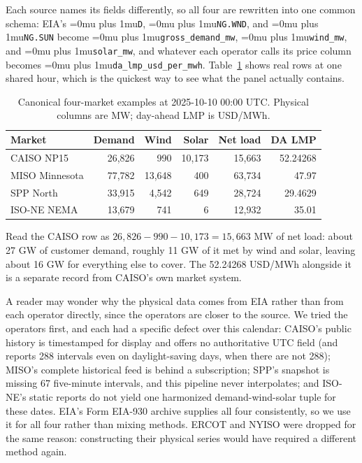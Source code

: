 ﻿\documentclass[12pt]{article}
\newcommand{\codepath}[1]{{\Urlmuskip=0mu plus 1mu\relax\nolinkurl{#1}}}
\begin{document}
Each source names its fields differently, so all four are rewritten into one
common schema: EIA's \codepath{D}, \codepath{NG.WND}, and \codepath{NG.SUN}
become \codepath{gross_demand_mw}, \codepath{wind_mw}, and \codepath{solar_mw},
and whatever each operator calls its price column becomes
\codepath{da_lmp_usd_per_mwh}. Table~\ref{tab:energy-example-rows} shows real
rows at one shared hour, which is the quickest way to see what the panel
actually contains.

\begin{table}[htbp]
  \centering
  \small
  \caption{Canonical four-market examples at 2025-10-10 00:00 UTC. Physical
  columns are MW; day-ahead LMP is USD/MWh.}
  \label{tab:energy-example-rows}
  \begin{tabular}{@{}lrrrrr@{}}
    \toprule
    Market & Demand & Wind & Solar & Net load & DA LMP \\
    \midrule
    CAISO NP15 & 26,826 & 990 & 10,173 & 15,663 & 52.24268 \\
    MISO Minnesota & 77,782 & 13,648 & 400 & 63,734 & 47.97 \\
    SPP North & 33,915 & 4,542 & 649 & 28,724 & 29.4629 \\
    ISO-NE NEMA & 13,679 & 741 & 6 & 12,932 & 35.01 \\
    \bottomrule
  \end{tabular}
\end{table}

Read the CAISO row as \(26{,}826-990-10{,}173=15{,}663\) MW of net load: about
27 GW of customer demand, roughly 11 GW of it met by wind and solar, leaving
about 16 GW for everything else to cover. The 52.24268 USD/MWh alongside it is a
separate record from CAISO's own market system.

A reader may wonder why the physical data comes from EIA rather than from each
operator directly, since the operators are closer to the source. We tried the
operators first, and each had a specific defect over this calendar: CAISO's
public history is timestamped for display and offers no authoritative UTC field
(and reports 288 intervals even on daylight-saving days, when there are not
288); MISO's complete historical feed is behind a subscription; SPP's snapshot
is missing 67 five-minute intervals, and this pipeline never interpolates; and
ISO-NE's static reports do not yield one harmonized demand-wind-solar tuple for
these dates. EIA's Form EIA-930 archive supplies all four consistently, so we
use it for all four rather than mixing methods. ERCOT and NYISO were dropped for
the same reason: constructing their physical series would have required a
different method again.
\end{document}
